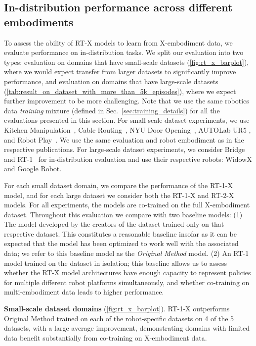 \documentclass[letterpaper, 10 pt, conference]{ieeeconf}  %
\newcommand{\edrbot}{Google Robot\xspace}
\newcommand{\cro}{X}
\begin{document}
\subsection{In-distribution performance across different embodiments}

To assess the ability of RT-X models to learn from \cro-embodiment data, we evaluate performance on in-distribution tasks.  We split our evaluation into two types: evaluation on domains that have small-scale datasets (\cref{fig:rt_x_barplot}), where we would expect transfer from larger datasets to significantly improve performance, and evaluation on domains that have large-scale datasets (\cref{tab:result_on_dataset_with_more_than_5k_episodes}), where we expect further improvement to be more challenging.
Note that we use the same robotics data \emph{training} mixture (defined in Sec.~\ref{sec:training_details}) for all the evaluations presented in this section. 
For small-scale dataset experiments, we use Kitchen Manipulation~\cite{dass2023jacoplay}, Cable Routing~\cite{luo2023multistage}, NYU Door Opening~\cite{pari2021surprising}, AUTOLab UR5 \cite{BerkeleyUR5Website}, and Robot Play~\cite{TacoPlayWebsite}. We use the same evaluation and robot embodiment as in the respective publications. 
For large-scale dataset experiments, we consider Bridge~\cite{walke2023bridgedata} and RT-1~\cite{brohan2023rt1} for in-distribution evaluation and use their respective robots: WidowX and \edrbot.



For each small dataset domain, we compare the performance of the RT-1-X model, and for each large dataset we consider both the RT-1-X and RT-2-X models. For all experiments, the models are co-trained on the full \cro-embodiment dataset. Throughout this evaluation we compare with two baseline models: (1) The model developed by the creators of the dataset trained only on that respective dataset. This constitutes a reasonable baseline insofar as it can be expected that the model has been optimized to work well with the associated data; we refer to this baseline model as the \emph{Original Method} model. (2) An RT-1 model trained on the dataset in isolation; this baseline allows us to assess whether the RT-X model architectures
have enough capacity to represent policies for multiple different robot platforms simultaneously, and whether co-training on multi-embodiment data leads to higher performance.

\textbf{Small-scale dataset domains} (\cref{fig:rt_x_barplot}). RT-1-X outperforms Original Method trained on each of the robot-specific datasets on 4 of the 5 datasets, with a large average improvement, demonstrating domains with limited data benefit substantially from co-training on \cro-embodiment data.
\end{document}
